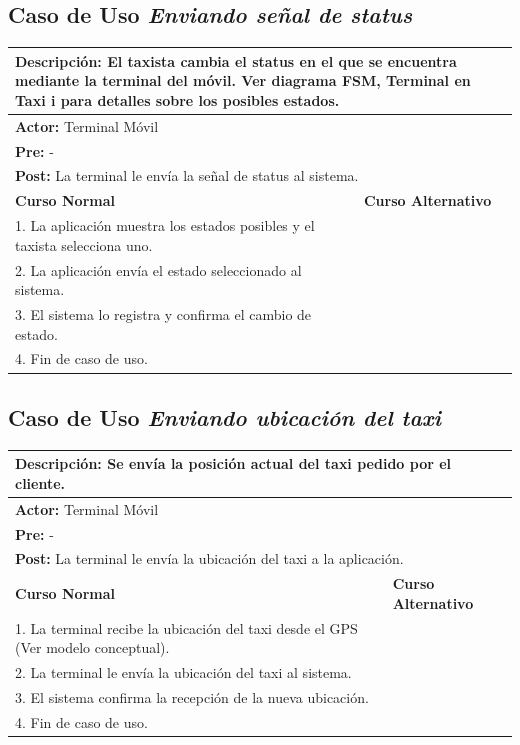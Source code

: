 \documentclass[a4paper]{article}
\begin{document}
\subsection{Caso de Uso \textit{Enviando se\~nal de status}}
\begin{center}
\begin{tabular}{|p{10cm} | p{6cm}|}
\hline
\multicolumn{2}{|p{16cm}|}{\textbf{Descripci\'on:} El taxista cambia el status en el que se encuentra mediante la terminal del m\'ovil. Ver diagrama FSM, Terminal en Taxi i para detalles sobre los posibles estados.} \\
\hline
\multicolumn{2}{|p{15cm}|}{\textbf{Actor:} Terminal M\'ovil } \\
\hline
\multicolumn{2}{|p{15cm}|}{\textbf{Pre:} - } \\
\hline
\multicolumn{2}{|p{15cm}|}{\textbf{Post:} La terminal le env\'ia la se\~nal de status al sistema. }\\
\hline
\textbf{Curso Normal}  & \textbf{Curso Alternativo} \\ \hline
1. La aplicaci\'on muestra los estados posibles y el taxista selecciona uno.  & \\ \hline
2. La aplicaci\'on env\'ia el estado seleccionado al sistema. & \\ \hline
3. El sistema lo registra y confirma el cambio de estado. & \\ \hline
4. Fin de caso de uso. & \\ \hline
\end{tabular}
\end{center}

\subsection{Caso de Uso \textit{Enviando ubicaci\'on del taxi}}
\begin{center}
\begin{tabular}{|p{10cm} | p{6cm}|}
\hline
\multicolumn{2}{|p{16cm}|}{\textbf{Descripci\'on: } Se env\'ia la posici\'on actual del taxi pedido por el cliente. }  \\
\hline
\multicolumn{2}{|p{15cm}|}{\textbf{Actor:} Terminal M\'ovil } \\
\hline
\multicolumn{2}{|p{15cm}|}{\textbf{Pre:} - } \\
\hline
\multicolumn{2}{|p{15cm}|}{\textbf{Post:} La terminal le env\'ia la ubicaci\'on del taxi a la aplicaci\'on. }\\
\hline
\textbf{Curso Normal}  & \textbf{Curso Alternativo} \\ \hline
1. La terminal recibe la ubicaci\'on del taxi desde el GPS (Ver modelo conceptual). & \\ \hline
2. La terminal le env\'ia la ubicaci\'on del taxi al sistema. & \\ \hline
3. El sistema confirma la recepci\'on de la nueva ubicaci\'on. & \\ \hline
4. Fin de caso de uso. & \\ \hline
\end{tabular}
\end{center}
\end{document}
